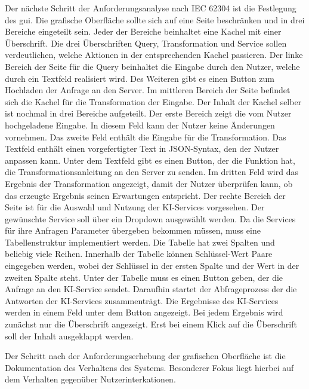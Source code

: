 Der nächste Schritt der Anforderungsanalyse nach IEC 62304 ist die Festlegung des \ac{gui}. Die grafische Oberfläche sollte sich auf eine Seite beschränken und in drei Bereiche eingeteilt sein. Jeder der Bereiche beinhaltet eine Kachel mit einer Überschrift. Die drei Überschriften \glqq Query\grqq{}, \glqq Transformation\grqq{} und \glqq Service\grqq{} sollen verdeutlichen, welche Aktionen in der entsprechenden Kachel passieren.
Der linke Bereich der Seite für die Query beinhaltet die Eingabe durch den Nutzer, welche durch ein Textfeld realisiert wird. Des Weiteren gibt es einen Button zum Hochladen der Anfrage an den Server. Im mittleren Bereich der Seite befindet sich die Kachel für die Transformation der Eingabe. Der Inhalt der Kachel selber ist nochmal in drei Bereiche aufgeteilt. Der erste Bereich zeigt die vom Nutzer hochgeladene Eingabe. In diesem Feld kann der Nutzer keine Änderungen vornehmen. Das zweite Feld enthält die Eingabe für die Transformation. Das Textfeld enthält einen vorgefertigter Text in JSON-Syntax, den der Nutzer anpassen kann. Unter dem Textfeld gibt es einen Button, der die Funktion hat, die Transformationsanleitung an den Server zu senden. Im dritten Feld wird das Ergebnis der Transformation angezeigt, damit der Nutzer überprüfen kann, ob das erzeugte Ergebnis seinen Erwartungen entspricht. 
Der rechte Bereich der Seite ist für die Auswahl und Nutzung der KI-Services vorgesehen. Der gewünschte Service soll über ein Dropdown ausgewählt werden. Da die Services für ihre Anfragen Parameter übergeben bekommen müssen, muss eine Tabellenstruktur implementiert werden. Die Tabelle hat zwei Spalten und beliebig viele Reihen. Innerhalb der Tabelle können Schlüssel-Wert Paare eingegeben werden, wobei der Schlüssel in der ersten Spalte und der Wert in der zweiten Spalte steht. Unter der Tabelle muss es einen Button geben, der die Anfrage an den KI-Service sendet. Daraufhin startet der Abfrageprozess der die Antworten der KI-Services zusammenträgt. Die Ergebnisse des KI-Services werden in einem Feld unter dem Button angezeigt. Bei jedem Ergebnis wird zunächst nur die Überschrift angezeigt. Erst bei einem Klick auf die Überschrift soll der Inhalt ausgeklappt werden.

Der Schritt nach der Anforderungserhebung der grafischen Oberfläche ist die Dokumentation des Verhaltens des Systems. Besonderer Fokus liegt hierbei auf dem Verhalten gegenüber Nutzerinterkationen.


